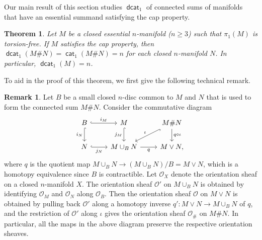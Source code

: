\documentclass[amscd,amssymb,verbatim,11pt]{amsart}
\theoremstyle{plain}
\newtheorem{theorem}[thm]{Theorem}
\theoremstyle{definition}
\newtheorem{remark}[thm]{Remark}
\DeclareMathOperator{\cat}{{\mathsf{cat}}}
\DeclareMathOperator{\dcat}{{\mathsf{dcat}}}
\def\scr{\mathcal}
\def\O{{\scr O}}
\begin{document}
Our main result of this section studies $\dcat_1$ of connected sums of manifolds that have an essential summand satisfying the cap property. 



\begin{theorem}\label{th: essential sum}
    Let $M$ be a closed essential $n$-manifold ($n\ge 3$) such that $\pi_1(M)$ is torsion-free. If $M$ satisfies the cap property, then $\dcat_1(M \# N) = \cat_1(M\# N) = n$ for each closed $n$-manifold $N$. In particular, $\dcat_1(M)=n$.
\end{theorem}

To aid in the proof of this theorem, we first give the following technical remark.

\begin{remark}\label{rem: sheaf details}
Let $B$ be a small closed $n$-disc common to $M$ and $N$ that is used to form the connected sum $M\# N$. Consider the commutative diagram
\[
\begin{tikzcd}
    B \arrow[hookrightarrow]{r}{i_M} \arrow[hookrightarrow]{d}[swap]{i_N} 
    &
    M \arrow[hookrightarrow]{d}[swap]{j_M} 
    &
    M\#N \arrow[hookrightarrow]{dl}[swap]{\iota} \arrow{d}{q\circ\iota}
    \\
    N \arrow[hookrightarrow]{r}[swap]{j_N} 
    & 
    M\cup_BN \arrow{r}[swap]{q} 
    & 
    M\vee N,
\end{tikzcd}
\]
where $q$ is the quotient map $M\cup_BN\to(M\cup_BN)/B = M \vee N$, which is a homotopy equivalence since $B$ is contractible. Let $\O_X$ denote the orientation sheaf on a closed $n$-manifold $X$. The orientation sheaf $\O'$ on $M\cup_B N$ is obtained by identifying $\O_M$ and $\O_N$ along $\O_B$. Then the orientation sheaf $\O$ on $M\vee N$ is obtained by pulling back $\O'$ along a homotopy inverse $q'\colon M\vee N\to M \cup_B N$ of $q$, and the restriction of $\O'$ along $\iota$ gives the orientation sheaf $\O_{\#}$ on $M\# N$. In particular, all the maps in the above diagram preserve the respective orientation sheaves.
\end{remark}
\end{document}
